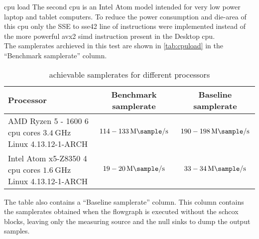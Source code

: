 \begin{subchapter}{\Acrshort{cpu} load}
  The second \gls{cpu} is an Intel Atom model intended
  for very low power laptop and tablet computers.
  To reduce the power consumption and die-area
  of this \gls{cpu} only the SSE to \acrshort{sse42} line of
  instructions were implemented instead of the
  more powerful \acrshort{avx2} \acrshort{simd} instruction present
  in the Desktop \gls{cpu}. \\

  The samplerates archieved in this test are shown
  in \autoref{tab:cpuload} in the ``Benchmark samplerate''
  column.

  \begin{table}[H]
    \centering
    \begin{tabular}{| l | c | c |}
      \hline
      Processor & Benchmark samplerate & Baseline samplerate \\

      \hline
      \parbox[c]{5cm}{\vspace{1mm} AMD Ryzen 5 - 1600 \\ 6 \acrshort{cpu} cores \\ $\SI{3.4}{\giga\hertz}$ \\ Linux 4.13.12-1-ARCH \vspace{1mm}} &
      \parbox[c]{5cm}{\centering $114 - \SI{133}{\mega\sample\per\second}$} &
      \parbox[c]{5cm}{\centering $190 - \SI{198}{\mega\sample\per\second}$} \\

      \hline
      \parbox[c]{5cm}{\vspace{1mm} Intel Atom x5-Z8350 \\ 4 \acrshort{cpu} cores \\ $\SI{1.6}{\giga\hertz}$ \\ Linux 4.13.12-1-ARCH \vspace{1mm}} &
      \parbox[c]{5cm}{\centering $19 - \SI{20}{\mega\sample\per\second}$} &
      \parbox[c]{5cm}{\centering $33 - \SI{34}{\mega\sample\per\second}$} \\

      \hline
    \end{tabular}
    \caption{achievable samplerates for different processors}
    \label{tab:cpuload}
  \end{table}

  The table also contains a ``Baseline samplerate'' column.
  This column contains the samplerates obtained when the flowgraph
  is executed without the \gls{schcox} blocks, leaving only
  the measuring source and the null sinks to dump the
  output samples.


\end{subchapter}
